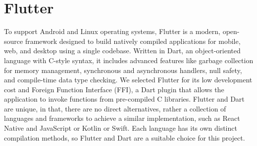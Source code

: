 \section{Flutter}
To support Android and Linux operating systems, Flutter is a modern, open-source framework designed to build natively compiled applications for mobile, web, and desktop using a single codebase. Written in Dart, an object-oriented language with C-style syntax, it includes advanced features like garbage collection for memory management, synchronous and asynchronous handlers, null safety, and compile-time data type checking. We selected Flutter for its low development cost and Foreign Function Interface (FFI), a Dart plugin that allows the application to invoke functions from pre-compiled C libraries. Flutter and Dart are unique, in that, there are no direct alternatives, rather a collection of languages and frameworks to achieve a similar implementation, such as React Native and JavaScript or Kotlin or Swift. Each language has its own distinct compilation methods, so Flutter and Dart are a suitable choice for this project.
